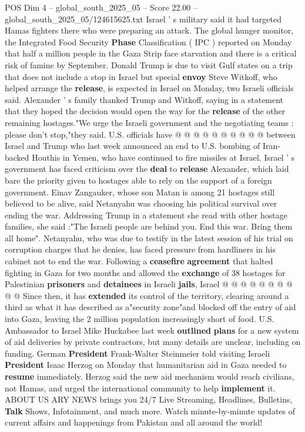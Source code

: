\begin{textsample}{POS Dim 4 – global\_south\_2025\_05 – Score 22.00 – global\_south\_2025\_05/124615625.txt}
Israel ' s military said it had targeted Hamas fighters there who were preparing an attack.
The global hunger monitor, the Integrated Food Security \textbf{Phase} Classification ( IPC ) reported on Monday that half a million people in the Gaza Strip face starvation and there is a critical risk of famine by September.
Donald Trump is due to visit Gulf states on a trip that does not include a stop in Israel but special \textbf{envoy} Steve Witkoff, who helped arrange the \textbf{release}, is expected in Israel on Monday, two Israeli officials said.
Alexander ' s family thanked Trump and Witkoff, saying in a statement that they hoped the decision would open the way for the \textbf{release} of the other remaining hostages."We urge the Israeli government and the negotiating teams : please don't stop,"they said.
U.S. officials have @ @ @ @ @ @ @ @ @ @ between Israel and Trump who last week announced an end to U.S. bombing of Iran-backed Houthis in Yemen, who have continued to fire missiles at Israel.
Israel ' s government has faced criticism over the \textbf{deal} to \textbf{release} Alexander, which laid bare the priority given to hostages able to rely on the support of a foreign government.
Einav Zangauker, whose son Matan is among 21 hostages still believed to be alive, said Netanyahu was choosing his political survival over ending the war.
Addressing Trump in a statement she read with other hostage families, she said :"The Israeli people are behind you.
End this war.
Bring them all home".
Netanyahu, who was due to testify in the latest session of his trial on corruption charges that he denies, has faced pressure from hardliners in his cabinet not to end the war.
Following a \textbf{ceasefire} \textbf{agreement} that halted fighting in Gaza for two months and allowed the \textbf{exchange} of 38 hostages for Palestinian \textbf{prisoners} and \textbf{detainees} in Israeli \textbf{jails}, Israel @ @ @ @ @ @ @ @ @ @ Since then, it has \textbf{extended} its control of the territory, clearing around a third as what it has described as a"security zone"and blocked off the entry of aid into Gaza, leaving the 2 million population increasingly short of food.
U.S.
Ambassador to Israel Mike Huckabee last week \textbf{outlined} \textbf{plans} for a new system of aid deliveries by private contractors, but many details are unclear, including on funding.
German \textbf{President} Frank-Walter Steinmeier told visiting Israeli \textbf{President} Isaac Herzog on Monday that humanitarian aid in Gaza needed to \textbf{resume} immediately.
Herzog said the new aid mechanism would reach civilians, not Hamas, and urged the international community to help \textbf{implement} it.
ABOUT US ARY NEWS brings you 24/7 Live Streaming, Headlines, Bulletins, \textbf{Talk} Shows, Infotainment, and much more.
Watch minute-by-minute updates of current affairs and happenings from Pakistan and all around the world!

\end{textsample}
